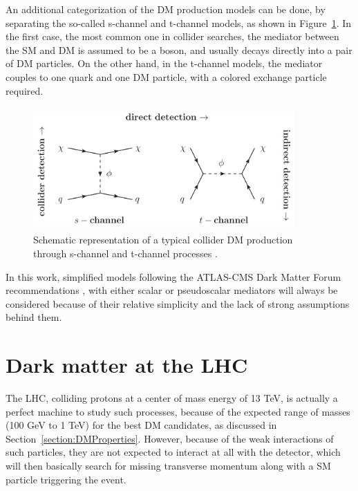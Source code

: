 \documentclass[a4paper, 10pt, openright]{report}
\begin{document}
An additional categorization of the \ac{DM} production models can be done, by separating the so-called s-channel and t-channel models, as shown in Figure~\ref{fig:STChannels}. In the first case, the most common one in collider searches, the mediator between the \ac{SM} and \ac{DM} is assumed to be a boson, and usually decays directly into a pair of \ac{DM} particles. On the other hand, in the t-channel models, the mediator couples to one quark and one \ac{DM} particle, with a colored exchange particle required.

\begin{figure}[htbp]
\begin{center}
\includegraphics[width=10cm, height=4.7cm]{figs/STChannels.png}
\caption{Schematic representation of a typical collider \ac{DM} production through s-channel and t-channel processes \cite{STChannels}.}
\label{fig:STChannels}
\end{center}
\end{figure}

In this work, simplified models following the ATLAS-CMS Dark Matter Forum recommendations \cite{Forum}, with either scalar or pseudoscalar mediators will always be considered because of their relative simplicity and the lack of strong assumptions behind them.%

\section{Dark matter at the \acf{LHC}} \label{section:ourChannel}

The \ac{LHC}, colliding protons at a center of mass energy of 13 TeV, is actually a perfect machine to study such processes, because of the expected range of masses (100 GeV to 1 TeV) for the best \ac{DM} candidates, as discussed in Section~\ref{section:DMProperties}. However, because of the weak interactions of such particles, they are not expected to interact at all with the detector, which will then basically search for missing transverse momentum along with a \ac{SM} particle triggering the event.
\end{document}
